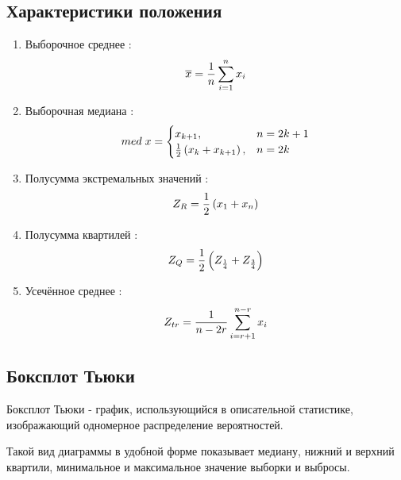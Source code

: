 \documentclass[a4]{article}
\begin{document}
\subsection{Характеристики положения}
\begin{enumerate}
\item Выборочное среднее \cite{average}:
\begin{equation}\label{eqn:average}
\overline{x} = \frac{1}{n}\sum_{i=1}^n x_i \hfill  
\end{equation}
\item Выборочная медиана \cite{med}:
\begin{equation}
med\; x = \begin{cases}
x_{k+1}, & n = 2k+1\\
\frac{1}{2}\left(x_k+x_{k+1}\right), & n = 2k
\end{cases} \hfill  \label{eqn:med}
\end{equation}
\item Полусумма экстремальных значений \cite{mean_extr}:
\begin{equation}
Z_R = \frac{1}{2}\left(x_1+x_n\right) \hfill  \label{eqn:mean_extr}
\end{equation}
\item Полусумма квартилей \cite{quartiles}:
\begin{equation}
Z_Q = \frac{1}{2}\left(Z_{\frac{1}{4}}+Z_{\frac{3}{4}}\right) \hfill  \label{eqn:quartiles}
\end{equation}
\item Усечённое среднее \cite{cut_mean}:
\begin{equation}
Z_{tr} = \frac{1}{n - 2r}\sum_{i=r+1}^{n-r} x_i \hfill  \label{eqn:cut_mean}
\end{equation}
\end{enumerate}

\subsection{Боксплот Тьюки}

Боксплот Тьюки - график, использующийся в описательной статистике, изображающий одномерное распределение вероятностей.

Такой вид диаграммы в удобной форме показывает медиану, нижний и верхний квартили, минимальное и максимальное значение выборки и выбросы.
\end{document}
